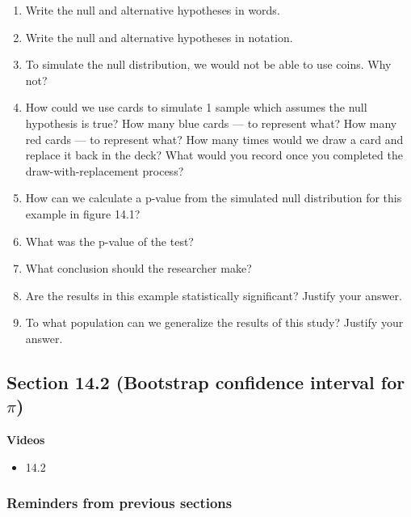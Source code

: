 \documentclass[
]{report}
\providecommand{\tightlist}{%
  \setlength{\itemsep}{0pt}\setlength{\parskip}{0pt}}
\newcommand{\rgs}{\vspace{12pt}} %
\begin{document}
\begin{enumerate}
\def\labelenumi{\arabic{enumi}.}
\item
  Write the null and alternative hypotheses in words.
  \rgs
  \rgs
\item
  Write the null and alternative hypotheses in notation.
  \rgs
\item
  To simulate the null distribution, we would not be able to use coins. Why not?
  \rgs
  \rgs
\item
  How could we use cards to simulate 1 sample which assumes the null hypothesis is true? How many blue cards --- to represent what? How many red cards --- to represent what? How many times would we draw a card and replace it back in the deck? What would you record once you completed the draw-with-replacement process?
  \rgs
  \rgs
  \rgs
\item
  How can we calculate a p-value from the simulated null distribution for this example in figure 14.1?
  \rgs
  \rgs
\item
  What was the p-value of the test?
  \rgs
\item
  What conclusion should the researcher make?
  \rgs
  \rgs
\item
  Are the results in this example statistically significant? Justify your answer.
  \rgs
  \rgs
\item
  To what population can we generalize the results of this study? Justify your answer.
  \rgs
\end{enumerate}

\hypertarget{section-14.2-bootstrap-confidence-interval-for-pi}{%
\subsection*{\texorpdfstring{Section 14.2 (Bootstrap confidence interval for \(\pi\))}{Section 14.2 (Bootstrap confidence interval for \textbackslash pi)}}\label{section-14.2-bootstrap-confidence-interval-for-pi}}


\textbf{Videos}

\begin{itemize}
\tightlist
\item
  14.2
\end{itemize}

\hypertarget{reminders-from-previous-sections-3}{%
\subsubsection*{Reminders from previous sections}\label{reminders-from-previous-sections-3}}
\end{document}
